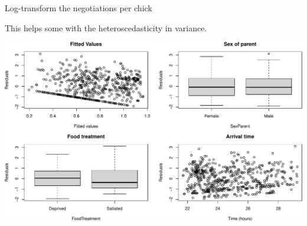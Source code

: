 \documentclass[
  ignorenonframetext,
]{beamer}
\newenvironment{Shaded}{\begin{snugshade}}{\end{snugshade}}
\newcommand{\DataTypeTok}[1]{\textcolor[rgb]{0.13,0.29,0.53}{#1}}
\newcommand{\DecValTok}[1]{\textcolor[rgb]{0.00,0.00,0.81}{#1}}
\newcommand{\KeywordTok}[1]{\textcolor[rgb]{0.13,0.29,0.53}{\textbf{#1}}}
\newcommand{\NormalTok}[1]{#1}
\newcommand{\OperatorTok}[1]{\textcolor[rgb]{0.81,0.36,0.00}{\textbf{#1}}}
\begin{document}
\begin{frame}[fragile]{Log-transform the negotiations per chick}
\protect\hypertarget{log-transform-the-negotiations-per-chick}{}

This helps some with the heteroscedasticity in variance.

\scriptsize

\begin{Shaded}
\end{Shaded}

\includegraphics{mixed_models_files/figure-beamer/unnamed-chunk-11-1.pdf}

\end{frame}
\end{document}
